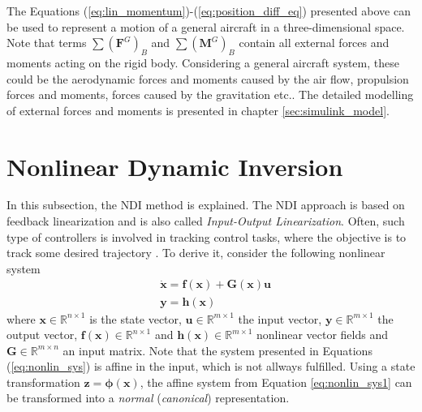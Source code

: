 \documentclass[11pt, a4paper, twoside]{report}
\begin{document}
The Equations (\ref{eq:lin_momentum})-(\ref{eq:position_diff_eq}) presented above can be used to represent a motion of a general aircraft in a three-dimensional space. Note that terms $\sum(\bm{F}^G)_B$ and $\sum (\bm{M}^G)_B$ contain all external forces and moments acting on the rigid body. Considering a general aircraft system, these could be the aerodynamic forces and moments caused by the air flow, propulsion forces and moments, forces caused by the gravitation etc.. The detailed modelling of external forces and moments is presented in chapter \ref{sec:simulink_model}.

\section{Nonlinear Dynamic Inversion} \label{sec:ndi}

In this subsection, the \acrlong{NDI} method is explained. The \acrshort{NDI} approach is based on feedback linearization and is also called \textit{Input-Output Linearization}. Often, such type of controllers is involved in tracking control tasks, where the objective is to track some desired trajectory \cite{Slotine}. To derive it, consider the following nonlinear system
\begin{subequations}
	\begin{align}
		&\bm{\dot{x}} = \bm{f}(\bm{x}) + \bm{G}(\bm{x})\bm{u} \label{eq:nonlin_sys1} \\
		&\bm{y} = \bm{h}(\bm{x}) \label{eq:nonlin_sys2}
	\end{align}
	\label{eq:nonlin_sys}
\end{subequations}
\hspace{-5pt}where $\bm{x} \in \mathbb{R}^{n \times 1}$ is the state vector, $\bm{u} \in \mathbb{R}^{m \times 1}$ the input vector, $\bm{y} \in \mathbb{R}^{m \times 1}$ the output vector, $\bm{f}(\bm{x}) \in \mathbb{R}^{n \times 1}$ and $\bm{h}(\bm{x}) \in \mathbb{R}^{m \times 1}$ nonlinear vector fields and $\bm{G} \in \mathbb{R}^{m \times n}$ an input matrix. Note that the system presented in Equations (\ref{eq:nonlin_sys}) is affine in the input, which is not allways fulfilled. Using a state transformation $\bm{z} = \bm{\phi}(\bm{x})$, the affine system from Equation \ref{eq:nonlin_sys1} can be transformed into a \textit{normal} (\textit{canonical}) representation. 
\end{document}
